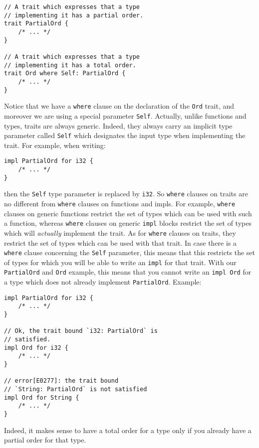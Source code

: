 \documentclass[twocolumn]{article}
\newcommand{\rust}[1]{\texttt{#1}}
\begin{document}
\begin{verbatim}
// A trait which expresses that a type
// implementing it has a partial order.
trait PartialOrd {
    /* ... */
}

// A trait which expresses that a type
// implementing it has a total order.
trait Ord where Self: PartialOrd {
    /* ... */
}
\end{verbatim}
Notice that we have a \rust{where} clause on the declaration of the \rust{Ord} trait, and moreover we are using a special parameter \rust{Self}. Actually, unlike functions and types, traits are always generic. Indeed, they always carry an implicit type parameter called \rust{Self} which designates the input type when implementing the trait. For example, when writing:
\begin{verbatim}
impl PartialOrd for i32 {
    /* ... */
}
\end{verbatim}
then the \rust{Self} type parameter is replaced by \rust{i32}. So \rust{where} clauses on traits are no different from \rust{where} clauses on functions and impls. For example, \rust{where} clauses on generic functions restrict the set of types which can be used with such a function, whereas \rust{where} clauses on generic \rust{impl} blocks restrict the set of types which will \textit{actually} implement the trait. As for \rust{where} clauses on traits, they restrict the set of types which can be used with that trait. In case there is a \rust{where} clause concerning the \rust{Self} parameter, this means that this restricts the set of types for which you will be able to write an \rust{impl} for that trait. With our \rust{PartialOrd} and \rust{Ord} example, this means that you cannot write an \rust{impl Ord} for a type which does not already implement \rust{PartialOrd}. Example:
\begin{verbatim}
impl PartialOrd for i32 {
    /* ... */
}

// Ok, the trait bound `i32: PartialOrd` is
// satisfied.
impl Ord for i32 {
    /* ... */
}

// error[E0277]: the trait bound
// `String: PartialOrd` is not satisfied
impl Ord for String {
    /* ... */
}
\end{verbatim}
Indeed, it makes sense to have a total order for a type only if you already have a partial order for that type.
\end{document}
